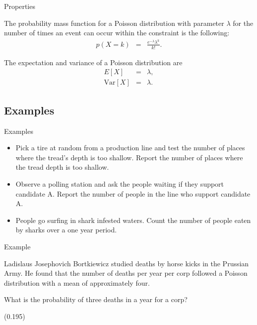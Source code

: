 \begin{frame}{Properties}

  The probability mass function for a Poisson distribution with
  parameter $\lambda$ for the number of times an event can occur
  within the constraint is the following:
  \begin{eqnarray*}
    p(X=k) & = & \frac{e^{-\lambda}\lambda^k}{k!}.
  \end{eqnarray*}

  The expectation and variance of a Poisson distribution are
  \begin{eqnarray*}
    E[X] & = & \lambda, \\
    \mathrm{Var}[X] & = & \lambda.
  \end{eqnarray*}

\end{frame}


\subsection{Examples}

\begin{frame}{Examples}

  \begin{itemize}
  \item Pick a tire at random from a production line and test the
    number of places where the tread's depth is too shallow. Report
    the number of places where the tread depth is too shallow.\\
  \item Observe a polling station and ask the people waiting if they
    support candidate A. Report the number of people in the line who
    support candidate A.
  \item People go surfing in shark infested waters. Count the number
    of people eaten by sharks over a one year period.
  \end{itemize}
  
\end{frame}

\begin{frame}{Example}

  \vfill

  Ladislaus Josephovich Bortkiewicz studied deaths by horse kicks in
  the Prussian Army. He found that the number of deaths per year per
  corp followed a Poisson distribution with a mean of approximately
  four.

  \vfill

  What is the probability of three deaths in a year for a corp?

  \vfill

  (0.195)

\end{frame}


